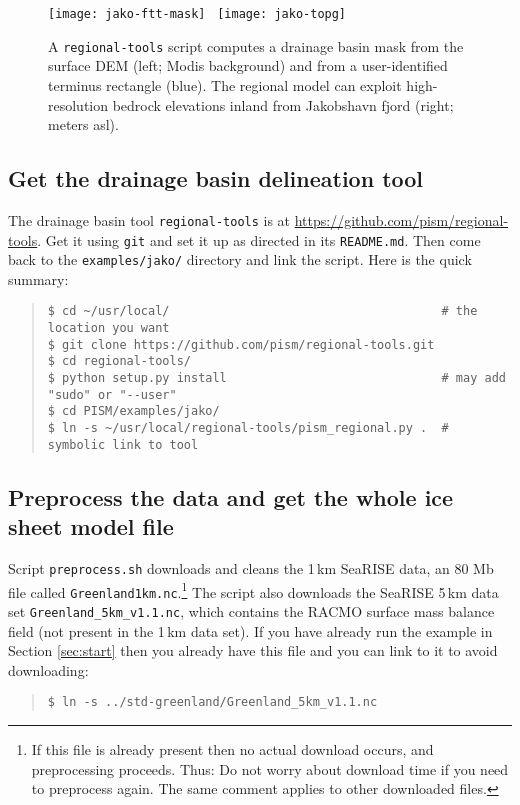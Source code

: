 \begin{figure}[ht]
  \centering
  \texttt{[image: jako-ftt-mask]} \, \texttt{[image: jako-topg]}
  \caption{A \texttt{regional-tools} script computes a drainage basin mask from the surface DEM (left; Modis background) and from a user-identified terminus rectangle (blue).  The regional model can exploit high-resolution bedrock elevations inland from Jakobshavn fjord (right; meters asl).}
  \label{fig:jako-basin-topg}
\end{figure}


\subsection*{Get the drainage basin delineation tool}
The drainage basin tool \texttt{regional-tools} is at \url{https://github.com/pism/regional-tools}.  Get it using \texttt{git} and set it up as directed in its \texttt{README.md}.  Then come back to the \texttt{examples/jako/} directory and link the script.  Here is the quick summary:
\begin{quote}\small
\begin{verbatim}
$ cd ~/usr/local/                                      # the location you want
$ git clone https://github.com/pism/regional-tools.git
$ cd regional-tools/
$ python setup.py install                              # may add "sudo" or "--user"
$ cd PISM/examples/jako/
$ ln -s ~/usr/local/regional-tools/pism_regional.py .  # symbolic link to tool
\end{verbatim}
\normalsize\end{quote}

\subsection*{Preprocess the data and get the whole ice sheet model file}
Script \texttt{preprocess.sh} downloads and cleans the 1\,km SeaRISE data, an 80 Mb file called \texttt{Greenland1km.nc}.\footnote{If this file is already present then no actual download occurs, and preprocessing proceeds.  Thus:  Do not worry about download time if you need to preprocess again.  The same comment applies to other downloaded files.}  The script also downloads the SeaRISE 5\,km data set \texttt{Greenland_5km_v1.1.nc}, which contains the RACMO surface mass balance field (not present in the 1\,km data set).  If you have already run the example in Section \ref{sec:start} then you already have this file and you can link to it to avoid downloading:
\begin{quote}\small
\begin{verbatim}
$ ln -s ../std-greenland/Greenland_5km_v1.1.nc
\end{verbatim}
\normalsize\end{quote}

